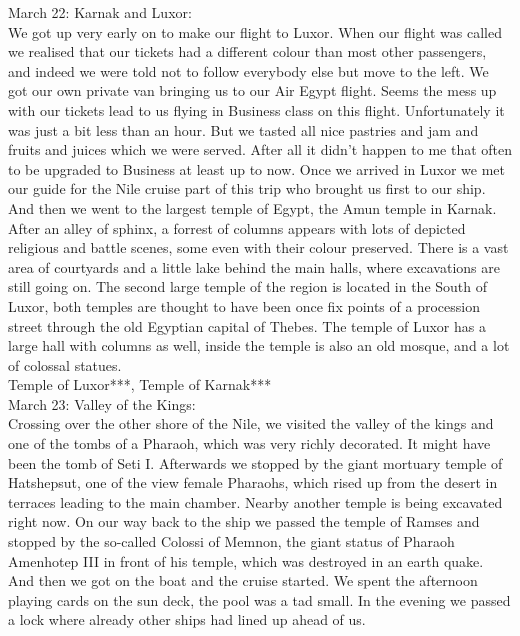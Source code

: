 March 22: Karnak and Luxor:\\
We got up very early on to make our flight to Luxor. When our flight was called we realised that our tickets had a different colour than most other passengers, and indeed we were told not to follow everybody else but move to the left. We got our own private van bringing us to our Air Egypt flight. Seems the mess up with our tickets lead to us flying in Business class on this flight. Unfortunately it was just a bit less than an hour. But we tasted all nice pastries and jam and fruits and juices which we were served. After all it didn't happen to me that often to be upgraded to Business at least up to now. Once we arrived in Luxor we met our guide for the Nile cruise part of this trip who brought us first to our ship. And then we went to the largest temple of Egypt, the Amun temple in Karnak. After an alley of sphinx, a forrest of columns appears with lots of depicted religious and battle scenes, some even with their colour preserved. There is a vast area of courtyards and a little lake behind the main halls, where excavations are still going on. The second large temple of the region is located in the South of Luxor, both temples are thought to have been once fix points of a procession street through the old Egyptian capital of Thebes. The temple of Luxor has a large hall with columns as well, inside the temple is also an old mosque, and a lot of colossal statues.\\

Temple of Luxor***, Temple of Karnak***\\

March 23: Valley of the Kings:\\
Crossing over the other shore of the Nile, we visited the valley of the kings and one of the tombs of a Pharaoh, which was very richly decorated. It might have been the tomb of Seti I. Afterwards we stopped by the giant mortuary temple of Hatshepsut, one of the view female Pharaohs, which rised up from the desert in terraces leading to the main chamber. Nearby another temple is being excavated right now. On our way back to the ship we passed the temple of Ramses and stopped by the so-called Colossi of Memnon, the giant status of Pharaoh Amenhotep III in front of his temple, which was destroyed in an earth quake. And then we got on the boat and the cruise started. We spent the afternoon playing cards on the sun deck, the pool was a tad small. In the evening we passed a lock where already other ships had lined up ahead of us.\\
  
